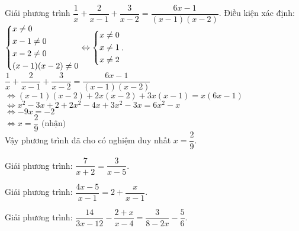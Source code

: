 \begin{bt}%
	Giải phương trình $\dfrac{1}{x} + \dfrac{2}{x-1} + \dfrac{3}{x-2} = \dfrac{6x-1}{(x-1)(x-2)}$.
	\loigiai
	{
		Điều kiện xác định: $\left\{\begin{aligned}& x \neq 0 \\& x - 1 \neq 0 \\& x - 2 \neq 0 \\& (x-1)(x-2) \neq 0\end{aligned}\right. \Leftrightarrow \left\{\begin{aligned}& x \neq 0 \\& x \neq 1 \\& x \neq 2\end{aligned}\right.$.\\
		\hspace*{0.6cm} $\dfrac{1}{x} + \dfrac{2}{x-1} + \dfrac{3}{x-2} = \dfrac{6x-1}{(x-1)(x-2)}$\\
		$\Leftrightarrow (x-1)(x-2) + 2x(x-2) + 3x (x-1) = x(6x-1)$\\
		$\Leftrightarrow x^2 - 3x + 2 + 2x^2 - 4x + 3x^2 - 3x = 6x^2 - x$\\
		$\Leftrightarrow -9x = -2$\\
		$\Leftrightarrow x = \dfrac{2}{9} \text{ (nhận)}$\\
		Vậy phương trình đã cho có nghiệm duy nhất $x = \dfrac{2}{9}$.
	}
\end{bt}
\begin{bt}%
	Giải phương trình: $\dfrac{7}{x+2}=\dfrac{3}{x-5}$.
\end{bt}
\begin{bt}%
	Giải phương trình: $\dfrac{4x-5}{x-1}=2+\dfrac{x}{x-1}$.
\end{bt}
\begin{bt}%
	Giải phương trình: $\dfrac{14}{3x-12}-\dfrac{2+x}{x-4}=\dfrac{3}{8-2x}-\dfrac{5}{6}$.
\end{bt}
